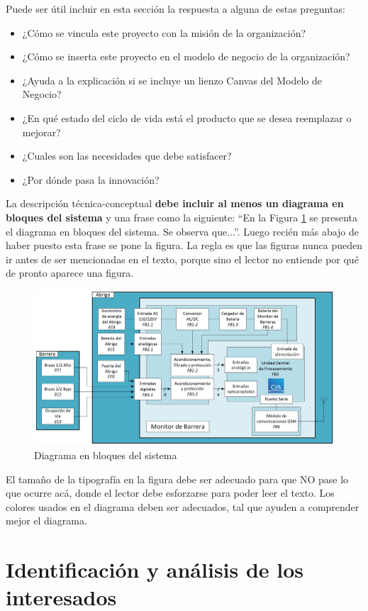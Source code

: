 \documentclass[11pt]{charter}
\begin{document}
Puede ser útil incluir en esta sección la respuesta a alguna de estas preguntas:

\begin{itemize}
\item ¿Cómo se vincula este proyecto con la misión de la organización?
\item ¿Cómo se inserta este proyecto en el modelo de negocio de la organización?
\item ¿Ayuda a la explicación si se incluye un lienzo Canvas del Modelo de Negocio?
\item ¿En qué estado del ciclo de vida está el producto que se desea reemplazar o mejorar?
\item ¿Cuales son las necesidades que debe satisfacer?
\item ¿Por dónde pasa la innovación?
\end{itemize}

La descripción técnica-conceptual \textbf{debe incluir al menos un diagrama en bloques del sistema }y una frase como la siguiente: “En la Figura \ref{fig:diagBloques} se presenta el diagrama en bloques del sistema. Se observa que...”. Luego recién más abajo de haber puesto esta frase se pone la figura. La regla es que las figuras nunca pueden ir antes de ser mencionadas en el texto, porque sino el lector no entiende por qué de pronto aparece una figura.

\begin{figure}[htpb]
\centering 
\includegraphics[width=.7\textwidth]{./Figuras/diagBloques.png}
\caption{Diagrama en bloques del sistema}
\label{fig:diagBloques}
\end{figure}

El tamaño de la tipografía en la figura debe ser adecuado para que NO pase lo que ocurre acá, donde el lector debe esforzarse para poder leer el texto. Los colores usados en el diagrama deben ser adecuados, tal que ayuden a comprender mejor el diagrama.

\section{Identificación y análisis de los interesados}
\label{sec:interesados}
\end{document}
